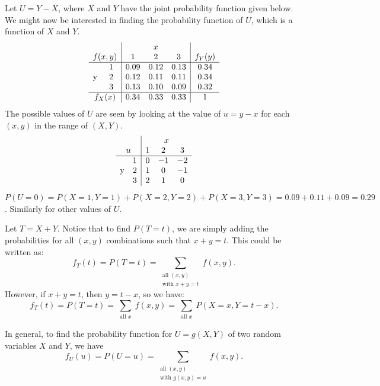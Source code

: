 \begin{example}
    Let $U = Y - X$, where $X$ and $Y$ have the joint probability function given below. We might now be interested in finding the probability function of $U$, which is a function of $X$ and $Y$.
    \[
        \begin{array}{cc|ccc|c}
            & & \multicolumn{3}{c|}{x} & \\
            \multicolumn{2}{c|}{f(x,y)} & 1 & 2 & 3 & f_Y(y) \\
            \hline
            \multirow{3}{*}{y} 
              & 1 & 0.09 & 0.12 & 0.13 & 0.34 \\
              & 2 & 0.12 & 0.11 & 0.11 & 0.34 \\
              & 3 & 0.13 & 0.10 & 0.09 & 0.32 \\
            \hline
            \multicolumn{2}{c|}{f_X(x)} & 0.34 & 0.33 & 0.33 & 1
        \end{array}
    \]
    The possible values of $U$ are seen by looking at the value of $u = y - x$ for each $(x,y)$ in the range of $(X,Y)$.
    \[
        \begin{array}{cc|ccc}
            & & \multicolumn{3}{c}{x}  \\
            \multicolumn{2}{c|}{u}
            & 1 & 2 & 3 \\
            \hline
            \multirow{3}{*}{y}
            & 1 & 0 & -1 & -2 \\
            & 2 & 1 & 0 & -1 \\
            & 3 & 2 & 1 & 0
        \end{array}
    \]
    $P(U = 0) = P(X=1,Y=1) + P(X=2,Y=2) + P(X=3,Y=3) = 0.09 + 0.11 + 0.09 = 0.29$. Similarly for other values of $U$.
\end{example}

Let $T = X + Y$. Notice that to find $P(T=t)$, we are simply adding the probabilities for all $(x,y)$ combinations such that $x + y = t$. This could be written as:
\[
    f_T(t) = P(T=t) = \sum_{\substack{\text{all } (x, y) \\ \text{with } x + y = t}} f(x,y).
\]
However, if $x+y = t$, then $y = t - x$, so we have:
\[
    f_T(t) = P(T=t) = \sum_{\substack{\text{all } x}} f(x,y) = \sum_{\substack{\text{all } x}} P(X=x,Y=t-x).
\]

\pagebreak


In general, to find the probability function for $U = g(X,Y)$ of two random variables $X$ and $Y$, we have
\[
    f_U(u) = P(U = u) = \sum_{\substack{\text{all } (x, y) \\ \text{with } g(x,y)=u}} f(x,y).
\]


